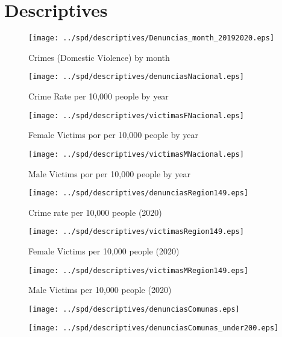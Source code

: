 \documentclass[11pt,letterpaper]{article}
\begin{document}
\section{Descriptives}
\begin{figure}[hbtp]
\caption{Crimes (Domestic Violence) by month}
\centering
\texttt{[image: ../spd/descriptives/Denuncias\_month\_20192020.eps]}
\end{figure}

\begin{figure}[hbtp]
\caption{Crime Rate per 10,000 people by year}
\centering
\texttt{[image: ../spd/descriptives/denunciasNacional.eps]}
\end{figure}

\begin{figure}[hbtp]
\caption{Female Victims por per 10,000 people by year}
\centering
\texttt{[image: ../spd/descriptives/victimasFNacional.eps]}
\end{figure}

\begin{figure}[hbtp]
\caption{Male Victims por per 10,000 people by year}
\centering
\texttt{[image: ../spd/descriptives/victimasMNacional.eps]}
\end{figure}

\begin{figure}[hbtp]
\caption{Crime rate per 10,000 people (2020)}
\centering
\texttt{[image: ../spd/descriptives/denunciasRegion149.eps]}
\end{figure}

\begin{figure}[hbtp]
\caption{Female Victims per 10,000 people (2020)}
\centering
\texttt{[image: ../spd/descriptives/victimasRegion149.eps]}
\end{figure}

\begin{figure}[hbtp]
\caption{Male Victims per 10,000 people (2020)}
\centering
\texttt{[image: ../spd/descriptives/victimasMRegion149.eps]}
\end{figure}

\begin{figure}[hbtp]
\caption{}
\centering
\texttt{[image: ../spd/descriptives/denunciasComunas.eps]}
\end{figure}

\begin{figure}[hbtp]
\caption{}
\centering
\texttt{[image: ../spd/descriptives/denunciasComunas\_under200.eps]}
\end{figure}
\end{document}
